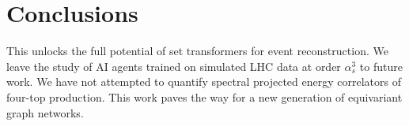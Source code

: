 \section{Conclusions}\label{sec:conclusions}

This unlocks the full potential of set transformers for event
reconstruction. We leave the study of AI agents trained on simulated LHC
data at order $\alpha_s^3$ to future work. We have not attempted to
quantify spectral projected energy correlators of four-top production.
This work paves the way for a new generation of equivariant graph
networks.

